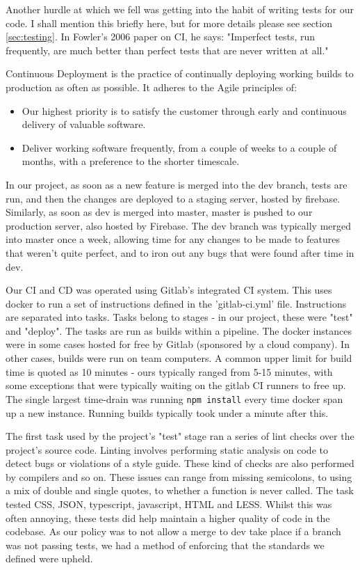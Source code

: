 \documentclass{l3proj}
\begin{document}
Another hurdle at which we fell was getting into the habit of writing tests for our code. I shall
 mention this briefly here, but for more details please see section \ref{sec:testing}. In Fowler's
 2006 paper on CI, he says: "Imperfect tests, run frequently, are much better than perfect tests
 that are never written at all."\cite{fowler2006continuous}

Continuous Deployment is the practice of continually deploying working builds to production
 as often as possible. It adheres to the Agile principles of:
 \begin{itemize}
 \item
 Our highest priority is to satisfy the customer
 through early and continuous delivery
 of valuable software. \cite{agileprinciples}
 \item
 Deliver working software frequently, from a
 couple of weeks to a couple of months, with a
 preference to the shorter timescale. \cite{agileprinciples}
 \end{itemize}
 In our project, as soon as a new feature is merged into the dev branch,
 tests are run, and then the changes are deployed to a staging server, hosted by firebase. Similarly,
 as soon as dev is merged into master, master is pushed to our production server, also hosted by Firebase.
 The dev branch was typically merged into master once a week, allowing time for any changes to be made
 to features that weren't quite perfect, and to iron out any bugs that were found after time in dev.

Our CI and CD was operated using Gitlab's integrated CI system. This uses docker to
 run a set of instructions defined in the 'gitlab-ci.yml' file.  Instructions are
 separated into tasks. Tasks belong to stages - in our project, these were
 "test" and "deploy". The tasks are run as builds within a pipeline. The docker instances were
 in some cases hosted for free by Gitlab (sponsored by a cloud company). In other cases,
 builds were run on team computers. A common upper limit for build time is quoted as
 10 minutes\cite{fowler2006continuous} - ours typically ranged from 5-15 minutes, with some exceptions that were
 typically waiting on the gitlab CI runners to free up. The single largest time-drain was
 running \texttt{npm install} every time docker span up a new instance. Running builds
 typically took under a minute after this.

 

The first task used by the project's "test" stage ran a series of lint checks over the
 project's source code. Linting involves performing static analysis on code to detect bugs
 or violations of a style guide. These kind of checks are also performed by compilers and
 so on. These issues can range from missing semicolons, to using a mix of
 double and single quotes, to whether a function is never called. The task tested CSS,
 JSON, typescript, javascript,  HTML and LESS. Whilst this was often annoying, these tests
 did help maintain a higher quality of code in the codebase. As our policy was to not allow a
 merge to dev take place if a branch was not passing tests, we had a method of
 enforcing that the standards we defined were upheld.
\end{document}
